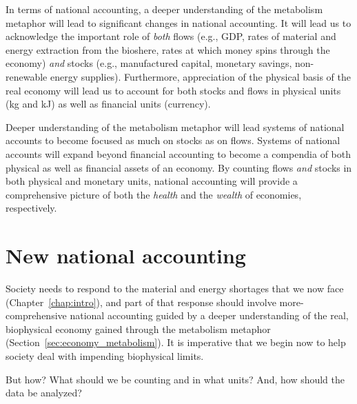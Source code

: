 In terms of national accounting, 
a deeper understanding of the metabolism metaphor 
will lead to significant changes in national accounting.
It will lead us to acknowledge
the important role of \emph{both} flows 
(e.g., GDP, 
rates of material and energy extraction from the bioshere,
rates at which money spins through the economy)
\emph{and} stocks 
(e.g., manufactured capital, monetary savings, non-renewable energy supplies).
Furthermore, appreciation of the physical basis of the real economy will lead us 
to account for both stocks and flows 
in physical units (kg and kJ) as well as financial units (currency).

Deeper understanding of the metabolism metaphor will
lead systems of national accounts to become
focused as much on stocks as on flows.
Systems of national accounts will expand beyond financial accounting
to become a compendia of both physical as well as financial assets
of an economy.
By counting flows \emph{and} stocks 
in both physical and monetary units,
national accounting will provide a comprehensive picture 
of both the \emph{health} and the \emph{wealth} of economies, respectively.


\section{New national accounting}
\label{sec:new_national_accounting}

Society needs to respond 
to the material and energy shortages that
we now face (Chapter~\ref{chap:intro}),
and part of that response
should involve more-comprehensive national accounting 
guided by a deeper understanding of the real, biophysical economy 
gained through the metabolism metaphor (Section~\ref{sec:economy_metabolism}).
It is imperative that we begin now
to help society deal with impending biophysical limits.

But how? 
What should we be counting and in what units?
And, how should the data be analyzed?



